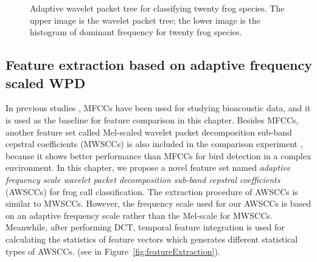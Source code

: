 \begin{figure}[htb!] %
\caption[Adaptive wavelet packet tree for classifying twenty frog species]{Adaptive wavelet packet tree for classifying twenty frog species. The upper image is the wavelet packet tree; the lower image is the histogram of dominant frequency for twenty frog species.}
\label{fig:tree20} 
\end{figure}



\subsection{Feature extraction based on adaptive frequency scaled WPD}
\label{Ch5:WPDfeature}
In previous studies \citep{bedoya2014automatic, Xie1504:Acoustic}, MFCCs have been used for studying bioacoustic data, and it is used as the baseline for feature comparison in this chapter. Besides MFCCs, another feature set called Mel-scaled wavelet packet decomposition sub-band cepstral coefficients (MWSCCs) is also included in the comparison experiment \citep{Zhang2015108}, because it shows better performance than MFCCs for bird detection in a complex environment. In this chapter, we propose a novel feature set named \textit{adaptive frequency scale wavelet packet decomposition sub-band cepstral coefficients} (AWSCCs) for frog call classification.
The extraction procedure of AWSCCs is similar to MWSCCs. However, the frequency scale used for our AWSCCs is based on an adaptive frequency scale rather than the Mel-scale for MWSCCs. Meanwhile, after performing DCT, temporal feature integration is used for calculating the statistics of feature vectors which generates different statistical types of AWSCCs. (see in Figure~\ref{fig:featureExtraction}). 


